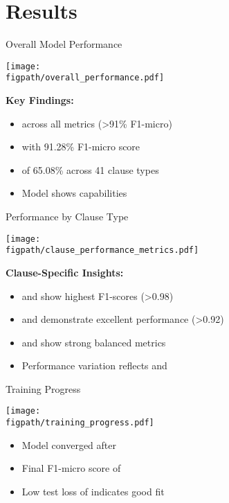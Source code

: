 
\section{Results}

\begin{frame}{Overall Model Performance}
\begin{center}
\texttt{[image: \\figpath/overall\_performance.pdf]}
\end{center}

\textbf{Key Findings:}
\begin{itemize}
    \item {} across all metrics (>91\% F1-micro)
    \item {} with 91.28\% F1-micro score
    \item {} of 65.08\% across 41 clause types
    \item Model shows  capabilities
\end{itemize}
\end{frame}

\begin{frame}{Performance by Clause Type}
\begin{center}
\texttt{[image: \\figpath/clause\_performance\_metrics.pdf]}
\end{center}

\textbf{Clause-Specific Insights:}
\begin{itemize}
    \item {} and  show highest F1-scores (>0.98)
    \item {} and  demonstrate excellent performance (>0.92)
    \item {} and  show strong balanced metrics
    \item Performance variation reflects  and 
\end{itemize}
\end{frame}

\begin{frame}{Training Progress}
\begin{center}
\texttt{[image: \\figpath/training\_progress.pdf]}
\end{center}

\begin{itemize}
    \item Model converged after 
    \item Final F1-micro score of 
    \item Low test loss of  indicates good fit
\end{itemize}
\end{frame}

